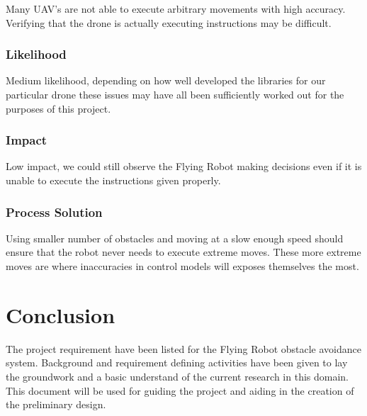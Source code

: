 \documentclass{article}
\begin{document}
	Many UAV's are not able to execute arbitrary movements with high accuracy. Verifying that the drone is actually executing instructions may be difficult. 
	
		\subsubsection{Likelihood}
		
		Medium likelihood, depending on how well developed the libraries for our particular drone these issues may have all been sufficiently worked out for the purposes of this project.
		
		\subsubsection{Impact}
		
		Low impact, we could still observe the Flying Robot making decisions even if it is unable to execute the instructions given properly.
		
		\subsubsection{Process Solution}
		
		Using smaller number of obstacles and moving at a slow enough speed should ensure that the robot never needs to execute extreme moves. These more extreme moves are where inaccuracies in control models will exposes themselves the most. 

\section{Conclusion}

The project requirement have been listed for the Flying Robot obstacle avoidance system. Background and requirement defining activities have been given to lay the groundwork and a basic understand of the current research in this domain. This document will be used for guiding the project and aiding in the creation of the preliminary design. 


\printbibliography

\end{document}
